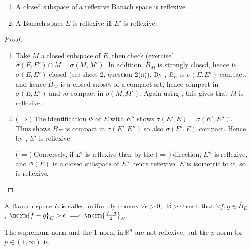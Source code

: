 \documentclass[twoside]{article}
\begin{document}
\begin{cor}\leavevmode
    \begin{enumerate}[label=(\roman*)]
        \item A closed subspace of a \hyperlink{def:refl}{reflexive} Banach space is reflexive.
        \item A Banach space $E$ is reflexive iff $E'$ is reflexive.
    \end{enumerate}
\end{cor}
\begin{proof}\leavevmode
    \begin{enumerate}[label=(\roman*)]
        \item Take $M$ a closed subspace of $E$, then check (exercise) $\sigma(E, E') \cap M = \sigma(M, M')$.
            In addition, $\overline{B}_M$ is strongly closed, hence is $\sigma(E, E')$ closed (see sheet 2, question 2(ii)).
            By , $\overline{B}_E$ is $\sigma(E, E')$ compact, and hence $\overline{B}_M$ is a closed subset of a compact set, hence compact in $\sigma(E, E')$ and so compact in $\sigma(M, M')$.
            Again using , this gives that $M$ is reflexive.
        \item ($\Rightarrow$) The identification $\Phi$ of $E$ with $E''$ shows $\sigma(E', E) = \sigma(E', E'')$.
            Thus  shows $\overline{B}_{E'}$ is compact in $\sigma(E', E'')$ so also $\sigma(E', E)$ compact.
            Hence by , $E'$ is reflexive.

            ($\Leftarrow$) Conversely, if $E'$ is reflexive then by the ($\Rightarrow$) direction, $E''$ is reflexive, and $\Phi(E)$ is a closed subspace of $E''$ hence reflexive.
            $E$ is isometric to it, so is reflexive. \qedhere
    \end{enumerate}
\end{proof}

\begin{defi}
    A Banach space $E$ is called uniformly convex $\forall \epsilon > 0$, $\exists \delta > 0$ such that $\forall f, g \in \overline{B}_E$, $\norm{f-g}_E > \epsilon \implies \norm{\frac{f+g}{2}}_E$.
\end{defi}
\begin{eg}
  The supremum norm and the $1$ norm in $\mathbb{R}^n$ are not reflexive, but the $p$ norm for $p \in (1, \infty)$ is.
\end{eg}
\end{document}
